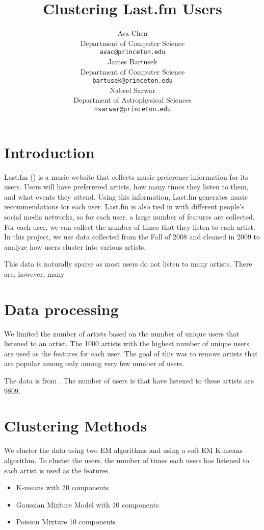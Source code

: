 \documentclass{article} %
\title{Clustering Last.fm Users}
\author{
Ava Chen\\
Department of Computer Science\\
\texttt{avac@princeton.edu}\\
\And
James Bartusek\\
Department of Computer Science\\
\texttt{bartusek@princeton.edu} \\
\And
Nabeel Sarwar\\
Department of Astrophysical Sciences\\
\texttt{nsarwar@princeton.edu} \\
}
\begin{document}
\maketitle

\begin{abstract}
\end{abstract}


\section{Introduction}

Last.fm (\cite{lastfm}) is a music website that collects music preference information for its users. Users will have preferrered artists, how many times they listen to them, and what events they attend. Using this information, Last.fm generates music recommendations for each user. Last.fm is also tied in with different people's social media networks, so for each user, a large number of features are collected. For each user, we can collect the number of times that they listen to each artist. In this project, we use data collected from the Fall of 2008 and cleaned in 2009 to analyze how users cluster into various artists.  

This data is naturally sparse as most users do not listen to many artists. There are, however, many 

\section{Data processing}

We limited the number of artists based on the number of unique users that listened to an artist. The 1000 artists with the highest number of unique users are used as the features for each user. The goal of this was to remove artists that are popular among only among very few number of users. 

The data is from \cite{data}. The number of users is that have listened to these artists are 9809. 


\section{Clustering Methods}


We cluster the data using two EM algorithms and using a soft EM K-means algorithm. To cluster the users, the number of times each users has listened to each artist is used as the features. 
\begin{itemize}
    \item K-means with 20 components
    \item Gaussian Mixture Model with 10 components
    \item Poisson Mixture 10 components
\end{itemize}
\end{document}
